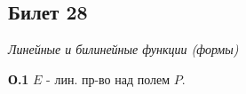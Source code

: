 \subsection{Билет 28}

\textit{Линейные и билинейные функции (формы)}

\textbf{О.1} $E$ - лин. пр-во над полем $P$.




